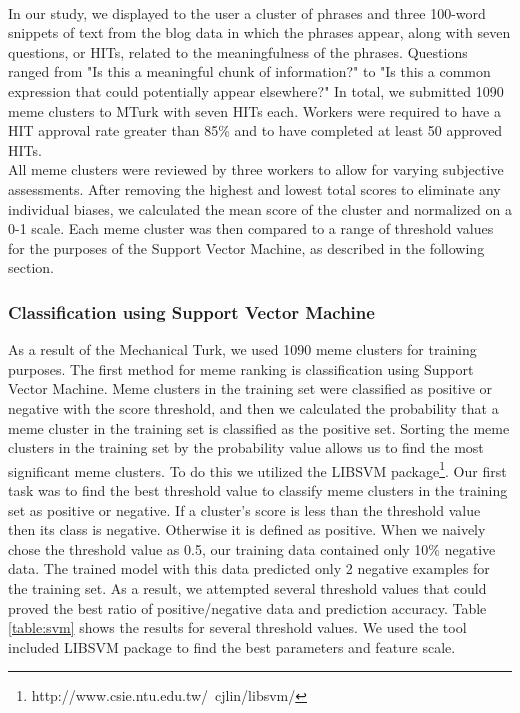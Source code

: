\documentclass{sig-alternate}
\begin{document}
\\   In our study, we displayed to the user a cluster of phrases and three 100-word snippets of text from the blog data in which the phrases appear, along with seven questions, or HITs, related to the meaningfulness of the phrases. Questions ranged from "Is this a meaningful chunk of information?" to "Is this a common expression that could potentially appear elsewhere?"  In total, we submitted 1090 meme clusters to MTurk with seven HITs each. Workers were required to have a HIT approval rate greater than 85\% and to have completed at least 50 approved HITs.
\\   All meme clusters were reviewed by three workers to allow for varying subjective assessments.  After removing the highest and lowest total scores to eliminate any individual biases, we calculated the mean score of the cluster and normalized on a 0-1 scale. Each meme cluster was then compared to a range of threshold values for the purposes of the Support Vector Machine, as described in the following section.

\subsubsection{Classification using Support Vector Machine}
As a result of the Mechanical Turk, we used 1090 meme clusters for training purposes. The first method for meme ranking is classification using Support Vector Machine. Meme clusters in the training set were classified as positive or negative with the score threshold, and then we calculated the probability that a meme cluster in the training set is classified as the positive set. Sorting the meme clusters in the training set by the probability value allows us to find the most significant meme clusters. To do this we utilized the LIBSVM package\footnote{http://www.csie.ntu.edu.tw/~cjlin/libsvm/}. Our first task was to find the best threshold value to classify meme clusters in the training set as positive or negative. If a cluster's score is less than the threshold value then its class is negative.  Otherwise it is defined as positive. When we naively chose the threshold value as 0.5, our training data contained only 10\% negative data.   The trained model with this data predicted only 2 negative examples for the training set. As a result, we attempted several threshold values that could proved the best ratio of positive/negative data and prediction accuracy. Table \ref{table:svm} shows the results for several threshold values. We used the tool included LIBSVM package to find the best parameters and feature scale.
\end{document}

